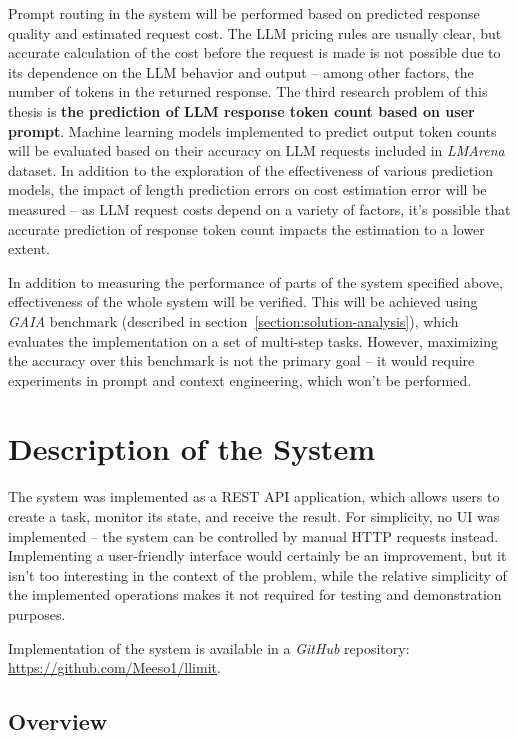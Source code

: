\documentclass[a4paper,11pt,twoside]{report}
\theoremstyle{definition}
\begin{document}
Prompt routing in the system will be performed based on predicted response quality and estimated request cost. The LLM pricing rules are usually clear, but accurate calculation of the cost before the request is made is not possible due to its dependence on the LLM behavior and output -- among other factors, the number of tokens in the returned response. The third research problem of this thesis is \textbf{the prediction of LLM response token count based on user prompt}. Machine learning models implemented to predict output token counts will be evaluated based on their accuracy on LLM requests included in \textit{LMArena} dataset. In addition to the exploration of the effectiveness of various prediction models, the impact of length prediction errors on cost estimation error will be measured -- as LLM request costs depend on a variety of factors, it's possible that accurate prediction of response token count impacts the estimation to a lower extent. 

In addition to measuring the performance of parts of the system specified above, effectiveness of the whole system will be verified. This will be achieved using \textit{GAIA} benchmark (described in section~\ref{section:solution-analysis}), which evaluates the implementation on a set of multi-step tasks. However, maximizing the accuracy over this benchmark is not the primary goal -- it would require experiments in prompt and context engineering, which won't be performed.

\chapter{Description of the System}

The system was implemented as a REST API application, which allows users to create a task, monitor its state, and receive the result. For simplicity, no UI was implemented -- the system can be controlled by manual HTTP requests instead. Implementing a user-friendly interface would certainly be an improvement, but it isn't too interesting in the context of the problem, while the relative simplicity of the implemented operations makes it not required for testing and demonstration purposes.

Implementation of the system is available in a \textit{GitHub} repository: \url{https://github.com/Meeso1/llimit}.

\section{Overview}
\end{document}
